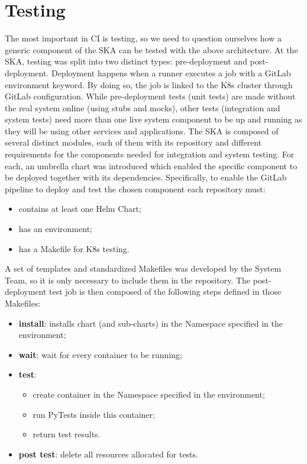 \documentclass[a4paper,
	       keeplastbox,   %
	       References
	       ]{jacow}
\begin{document}
\section{Testing}
The most important in CI is testing, so we need to question ourselves how a generic component of the SKA can be tested with the above architecture. At the SKA, testing was split into two distinct types: pre-deployment and post-deployment. Deployment happens when a runner executes a job with a GitLab environment keyword. By doing so, the job is linked to the K8s cluster through GitLab configuration. While pre-deployment tests (unit tests) are made without the real system online (using stubs and mocks), other tests (integration and system tests) need more than one live system component to be up and running as they will be using other services and applications. The SKA is composed of several distinct modules, each of them with its repository and different requirements for the components needed for integration and system testing. For each, an umbrella chart was introduced which enabled the specific component to be deployed together with its dependencies. Specifically, to enable the GitLab pipeline to deploy and test the chosen component each repository must:

\begin{itemize}
	\setlength\itemsep{0.1em}
    \item contains at least one Helm Chart;
    \item has an environment;
    \item has a Makefile for K8s testing.
\end{itemize}

A set of templates and standardized Makefiles was developed by the System Team, so it is only necessary to include them in the repository. The post-deployment test job is then composed of the following steps defined in those Makefiles:

\begin{itemize}
	\setlength\itemsep{0.1em}
    \item \textbf{install}: installs chart (and sub-charts) in the Namespace specified in the environment;
    \item \textbf{wait}: wait for every container to be running;
    \item \textbf{test}:
    \begin{itemize}
	\setlength\itemsep{0.1em}
	\item create container in the Namespace specified in the environment;
	\item run PyTests inside this container;
	\item return test results.
    \end{itemize}
    \item \textbf{post test}: delete all resources allocated for tests.
\end{itemize}
\end{document}
